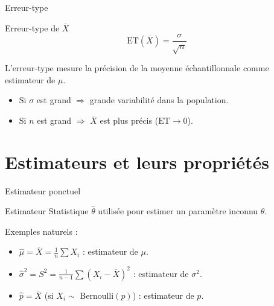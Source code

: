\documentclass{BeamerTemplate}
\begin{document}
\begin{frame}[t]{Erreur-type}

\begin{Boite}{Erreur-type de $\overline{X}$}
$$\text{ET}(\overline{X}) = \frac{\sigma}{\sqrt{n}}$$
\end{Boite}

\medskip
L'erreur-type mesure la \alert{précision} de la moyenne échantillonnale comme estimateur de $\mu$.

\bigskip
\begin{itemize}\itemsep5mm
  \item Si $\sigma$ est grand $\Rightarrow$ grande variabilité dans la population.
  \item Si $n$ est grand $\Rightarrow$ $\overline{X}$ est plus précis ($\text{ET} \to 0$).
\end{itemize}

\end{frame}

\section{Estimateurs et leurs propriétés}

\begin{frame}[t]{Estimateur ponctuel}

\begin{Boite}{Estimateur}
Statistique $\hat{\theta}$ utilisée pour estimer un paramètre inconnu $\theta$.
\end{Boite}

\medskip
Exemples naturels :
\begin{itemize}\itemsep4mm
  \item $\hat{\mu} = \overline{X} = \frac{1}{n}\sum X_i$ : estimateur de $\mu$.
  \item $\hat{\sigma}^2 = S^2 = \frac{1}{n-1}\sum(X_i - \overline{X})^2$ : estimateur de $\sigma^2$.
  \item $\hat{p} = \overline{X}$ (si $X_i \sim$ Bernoulli$(p)$) : estimateur de $p$.
\end{itemize}

\end{frame}
\end{document}

